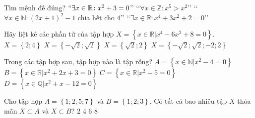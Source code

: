 \begin{ex}%
	Tìm mệnh đề đúng?
	\choice
	{$\lq\lq\exists x\in\mathbb{R}\colon{x^2}+3=0$\rq\rq}
	{\lq\lq$\forall x\in\mathbb{Z}\colon{x^5}>x^2$\rq\rq}
	{\True \lq\lq$\forall x\in\mathbb{N}\colon\left(2x+1\right)^2-1$ chia hết cho $4$\rq\rq}
	{\lq\lq$\exists x\in\mathbb{R}\colon{x^4}+3x^2+2=0$\rq\rq}
\end{ex}
%
\begin{ex}%
	Hãy liệt kê các phần tử của tập hợp $X=\left\{ x\in\mathbb{R}\big|{x^4}-6x^2+8=0\right\}$.
	\choice
	{$X=\left\{ 2;4\right\}$}
	{$X=\left\{-\sqrt{2};\sqrt{2}\right\}$}
	{$X=\left\{\sqrt{2};2\right\}$} {$X=\left\{-\sqrt{2};\sqrt{2};-2;2\right\}$}
\end{ex}
\begin{ex}%
	Trong các tập hợp sau, tập hợp nào là tập rỗng?
	\choice
	{$A=\left\lbrace  x\in\mathbb{N}\big|x^2-4=0\right\rbrace $}
	{\True $B=\left\lbrace x\in\mathbb{R}\big|x^2+2x+3=0\right\rbrace $}
	{$C=\left\lbrace  x\in\mathbb{R}\big|x^2-5=0\right\rbrace $}
	{$D=\left\lbrace  x\in\mathbb{Q}\big|x^2+x-12=0\right\rbrace $}
\end{ex}
%
\begin{ex}%
	Cho tập hợp $A=\left\{ 1;2;5;7\right\}$ và $B=\left\{ 1;2;3\right\}$. Có tất cả bao nhiêu tập $X$ thỏa mãn $X\subset A$ và $X\subset B$?
	\choice
	{$2$}
	{\True $4$}
	{$6$}
	{$8$}
\end{ex}
